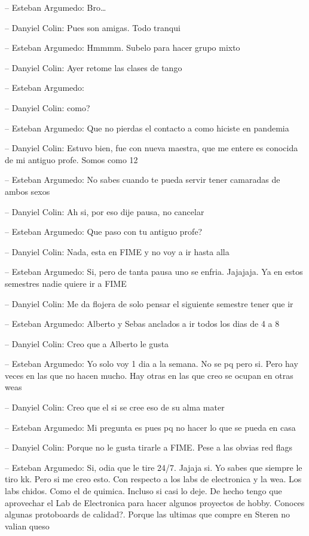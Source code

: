 -- Esteban Argumedo: Bro\ldots{}

-- Danyiel Colin: Pues son amigas. Todo tranqui

-- Esteban Argumedo: Hmmmm. Subelo para hacer grupo mixto

-- Danyiel Colin: Ayer retome las clases de tango

-- Esteban Argumedo:

-- Danyiel Colin: como?

-- Esteban Argumedo: Que no pierdas el contacto a como hiciste en
pandemia

-- Danyiel Colin: Estuvo bien, fue con nueva maestra, que me entere es
conocida de mi antiguo profe. Somos como 12

-- Esteban Argumedo: No sabes cuando te pueda servir tener camaradas de
ambos sexos

-- Danyiel Colin: Ah si, por eso dije pausa, no cancelar

-- Esteban Argumedo: Que paso con tu antiguo profe?

-- Danyiel Colin: Nada, esta en FIME y no voy a ir hasta alla

-- Esteban Argumedo: Si, pero de tanta pausa uno se enfria. Jajajaja. Ya
en estos semestres nadie quiere ir a FIME

-- Danyiel Colin: Me da flojera de solo pensar el siguiente semestre
tener que ir

-- Esteban Argumedo: Alberto y Sebas anclados a ir todos los dias de 4 a
8

-- Danyiel Colin: Creo que a Alberto le gusta

-- Esteban Argumedo: Yo solo voy 1 dia a la semana. No se pq pero si.
Pero hay veces en las que no hacen mucho. Hay otras en las que creo se
ocupan en otras weas

-- Danyiel Colin: Creo que el si se cree eso de su alma mater

-- Esteban Argumedo: Mi pregunta es pues pq no hacer lo que se pueda en
casa

-- Danyiel Colin: Porque no le gusta tirarle a FIME. Pese a las obvias
red flags

-- Esteban Argumedo: Si, odia que le tire 24/7. Jajaja si. Yo sabes que
siempre le tiro kk. Pero si me creo esto. Con respecto a los labs de
electronica y la wea. Los labs chidos. Como el de quimica. Incluso si
casi lo deje. De hecho tengo que aprovechar el Lab de Electronica para
hacer algunos proyectos de hobby. Conoces algunas protoboards de
calidad?. Porque las ultimas que compre en Steren no valian queso

